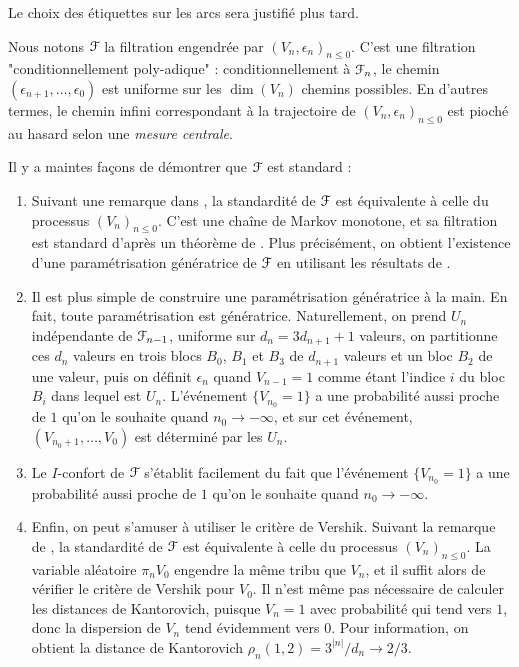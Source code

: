 \documentclass[12pt,a4paper]{article}
\begin{document}
Le choix des étiquettes sur les arcs sera justifié plus tard.

Nous notons $\EuScript{F}$ la filtration engendrée par ${(V_n, \epsilon_n)}_{n \leq 0}$. 
C'est une filtration "conditionnellement poly-adique" :  
conditionnellement à $\EuScript{F}_n$, le chemin $(\epsilon_{n+1}, \ldots, \epsilon_0)$ 
est uniforme sur les $\dim(V_n)$ chemins possibles. 
En d'autres termes, le chemin infini correspondant à la trajectoire 
de ${(V_n, \epsilon_n)}_{n \leq 0}$ est pioché au hasard selon une \emph{mesure centrale}. 

Il y a maintes façons de démontrer que $\EuScript{F}$ est standard :

\begin{enumerate}
\item Suivant une remarque dans \cite{JLR}, la standardité de $\EuScript{F}$ est équivalente 
à celle du processus ${(V_n)}_{n \leq 0}$. C'est une chaîne de Markov monotone, 
 et sa filtration est standard d'après un théorème de \cite{JLR}. 
 Plus précisément, on obtient l'existence d'une paramétrisation 
 génératrice de $\EuScript{F}$ en utilisant les résultats de \cite{JLR}.
 
\item Il est plus simple de construire une paramétrisation génératrice à la main. 
En fait, toute paramétrisation est génératrice. 
Naturellement, on prend $U_n$ indépendante de $\EuScript{F}_{n-1}$, uniforme sur 
$d_n = 3d_{n+1} +1$ valeurs,  
on partitionne ces $d_n$ valeurs en trois blocs $B_0$, $B_1$ et $B_3$ de $d_{n+1}$ valeurs 
et un bloc $B_2$ de une valeur, puis on définit $\epsilon_n$ quand $V_{n-1}=1$ 
comme étant l'indice $i$ du bloc $B_i$ dans lequel est $U_n$. 
L'événement $\{V_{n_0}=1\}$ a une probabilité aussi proche de $1$ qu'on le souhaite quand 
${n_0} \to -\infty$, et sur cet événement, $(V_{n_0+1}, \ldots, V_0)$ est 
déterminé par les $U_n$. 
 
\item Le $I$-confort de $\EuScript{F}$ s'établit facilement du fait que 
l'événement $\{V_{n_0}=1\}$ a une probabilité aussi proche de $1$ qu'on le souhaite quand 
${n_0} \to -\infty$. 

\item Enfin, on peut s'amuser à utiliser le critère de Vershik. 
Suivant la remarque de \cite{JLR}, la standardité de $\EuScript{F}$ est équivalente 
à celle du processus ${(V_n)}_{n \leq 0}$. La variable aléatoire $\pi_n V_0$ 
engendre la même tribu que $V_n$, et il suffit alors de vérifier le critère 
de Vershik pour $V_0$. Il n'est même pas nécessaire de calculer 
les distances de Kantorovich, puisque $V_n=1$ avec probabilité qui tend vers 
$1$, donc la dispersion de $V_n$ tend évidemment vers $0$. 
Pour information, on obtient la distance de Kantorovich 
$\rho_n(1,2)=3^{|n|}/d_n \to 2/3$. 
\end{enumerate}
\end{document}
